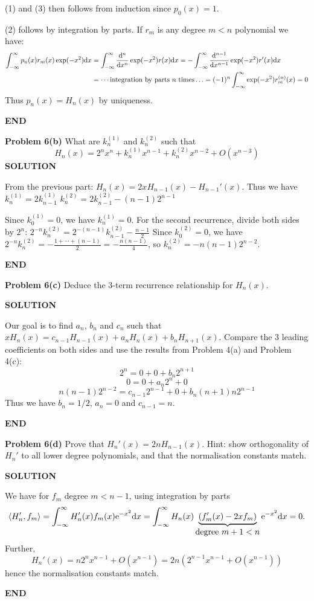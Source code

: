 \documentclass[12pt,a4paper]{article}
\begin{document}
(1) and (3) then follows from induction since $p_0(x)=1$.

(2) follows by integration by parts. If $r_m$ is any degree $m<n$ polynomial we have:
\begin{align*}
\int_{-\ensuremath{\infty}}^\ensuremath{\infty} p_n(x)r_m(x)\exp(-x^2){\rm d}x&=\int_{-\ensuremath{\infty}}^\ensuremath{\infty}{{\rm d}^n \over {\rm d}x^n} \exp(-x^2)r(x){\rm d}x = -\int_{-\ensuremath{\infty}}^\ensuremath{\infty}{{\rm d}^{n-1} \over {\rm d}x^{n-1}} \exp(-x^2)r'(x){\rm d}x\\
&=\ensuremath{\cdots}\text{integration by parts $n$ times}\ensuremath{\ldots}=(-1)^n\int_{-\ensuremath{\infty}}^\ensuremath{\infty} \exp(-x^2)r_m^{(n)}(x)=0
\end{align*}
Thus $p_n(x) = H_n(x)$ by uniqueness.

\textbf{END}

\textbf{Problem 6(b)} What are $k_n^{(1)}$ and $k_n^{(2)}$ such that
\[
H_n(x) = 2^n x^n + k_n^{(1)} x^{n-1} + k_n^{(2)} x^{n-2} + O(x^{n-3})
\]
\textbf{SOLUTION}

From the previous part: $H_n(x)=2xH_{n-1}(x)-H_{n-1}'(x).$ Thus we have $k_n^{(1)}=2k_{n-1}^{(1)}$ $k_n^{(2)}=2k_{n-1}^{(2)}-(n-1)2^{n-1}$

Since $k_0^{(1)}=0$, we have $k_n^{(1)}=0$. For the second recurrence, divide both sides by $2^n$: $2^{-n}k_n^{(2)}=2^{-(n-1)}k_{n-1}^{(2)}-\frac{n-1}{2}$ Since $k_0^{(2)}=0$, we have $2^{-n}k_n^{(2)}=-\frac{1+\ensuremath{\cdots}+(n-1)}{2}=-\frac{n(n-1)}{4}$, so $k_n^{(2)}=-n(n-1)2^{n-2}$.

\textbf{END}

\textbf{Problem 6(c)} Deduce the 3-term recurrence relationship for $H_n(x)$.

\textbf{SOLUTION}

Our goal is to find $a_n$, $b_n$ and $c_n$ such that $xH_n(x)=c_{n-1}H_{n-1}(x)+a_nH_n(x)+b_nH_{n+1}(x).$ Compare the 3 leading coefficients on both sides and use the results from Problem 4(a) and Problem 4(c):
\[
2^n=0+0+b_n2^{n+1}
\]
\[
0=0+a_n2^n+0
\]
\[
n(n-1)2^{n-2}=c_{n-1}2^{n-1}+0+b_n(n+1)n2^{n-1}
\]
Thus we have $b_n=1/2$, $a_n=0$ and $c_{n-1}=n$.

\textbf{END}

\textbf{Problem 6(d)} Prove that $H_n'(x) = 2n H_{n-1}(x)$. Hint: show orthogonality of $H_n'$ to all lower degree polynomials, and that the normalisation constants match.

\textbf{SOLUTION}

We have for $f_m$ degree $m < n-1$, using integration by parts
\[
\ensuremath{\langle}H_n', f_m\ensuremath{\rangle} = \ensuremath{\int}_{-\ensuremath{\infty}}^\ensuremath{\infty} H_n'(x) f_m(x) {\rm e}^{-x^2} {\rm d} x =  \ensuremath{\int}_{-\ensuremath{\infty}}^\ensuremath{\infty} H_n(x) \underbrace{(f_m'(x) -2x f_m)}_{\hbox{degree $m+1 < n$}}  {\rm e}^{-x^2} {\rm d} x = 0.
\]
Further,
\[
H_n'(x) = n 2^n x^{n-1} + O(x^{n-1}) = 2n (2^{n-1} x^{n-1} + O(x^{n-1}))
\]
hence the normalisation constants match.

\textbf{END}
\end{document}
